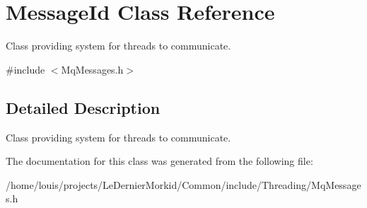 \hypertarget{class_message_id}{}\section{Message\+Id Class Reference}
\label{class_message_id}


Class providing system for threads to communicate.  




{\ttfamily \#include $<$Mq\+Messages.\+h$>$}



\subsection{Detailed Description}
Class providing system for threads to communicate. 

The documentation for this class was generated from the following file\+:\begin{DoxyCompactItemize}
\item 
/home/louis/projects/\+Le\+Dernier\+Morkid/\+Common/include/\+Threading/Mq\+Messages.\+h\end{DoxyCompactItemize}
